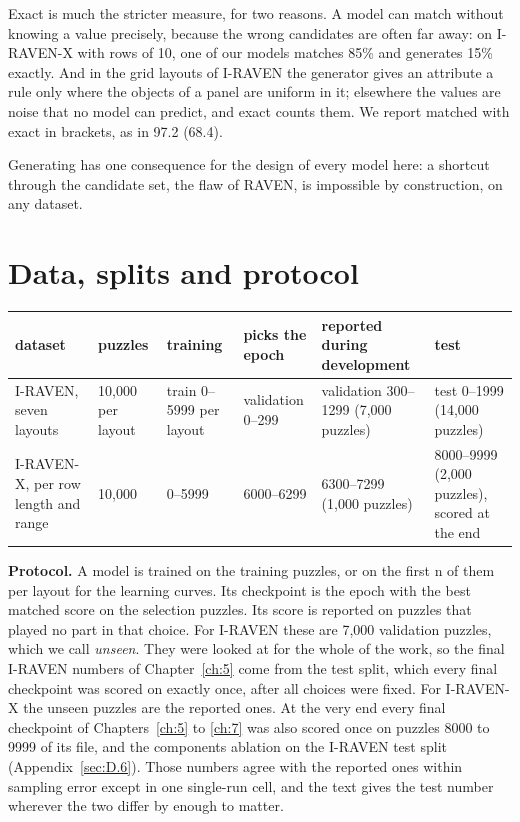 Exact is much the stricter measure, for two reasons. A model can match without knowing a value precisely, because the wrong candidates are often far away: on I-RAVEN-X with rows of 10, one of our models matches 85\% and generates 15\% exactly. And in the grid layouts of I-RAVEN the generator gives an attribute a rule only where the objects of a panel are uniform in it; elsewhere the values are noise that no model can predict, and exact counts them. We report matched with exact in brackets, as in 97.2 (68.4).

Generating has one consequence for the design of every model here: a shortcut through the candidate set, the flaw of RAVEN, is impossible by construction, on any dataset.

\section{Data, splits and protocol}\label{sec:4.2}

\begin{center}\small
\begin{tabularx}{\linewidth}{@{}YlYlYY@{}}
\toprule
dataset & puzzles & training & picks the epoch & reported during development & test \\
\midrule
I-RAVEN, seven layouts & 10,000 per layout & train 0–5999 per layout & validation 0–299 & validation 300–1299 (7,000 puzzles) & test 0–1999 (14,000 puzzles) \\
I-RAVEN-X, per row length and range & 10,000 & 0–5999 & 6000–6299 & 6300–7299 (1,000 puzzles) & 8000–9999 (2,000 puzzles), scored at the end \\
\bottomrule
\end{tabularx}
\end{center}

\textbf{Protocol.} A model is trained on the training puzzles, or on the first n of them per layout for the learning curves. Its checkpoint is the epoch with the best matched score on the selection puzzles. Its score is reported on puzzles that played no part in that choice. For I-RAVEN these are 7,000 validation puzzles, which we call \emph{unseen}. They were looked at for the whole of the work, so the final I-RAVEN numbers of Chapter~\ref{ch:5} come from the test split, which every final checkpoint was scored on exactly once, after all choices were fixed. For I-RAVEN-X the unseen puzzles are the reported ones. At the very end every final checkpoint of Chapters~\ref{ch:5} to \ref{ch:7} was also scored once on puzzles 8000 to 9999 of its file, and the components ablation on the I-RAVEN test split (Appendix~\ref{sec:D.6}). Those numbers agree with the reported ones within sampling error except in one single-run cell, and the text gives the test number wherever the two differ by enough to matter.

